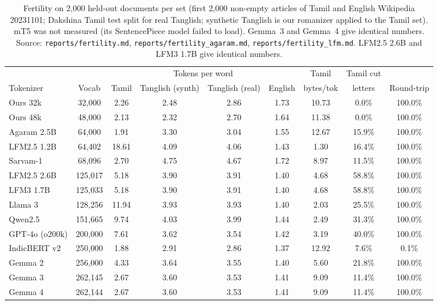 \documentclass[11pt]{article}
\begin{document}
\begin{table}[t]
\centering
\small
\begin{tabular}{lcccccccc}
\toprule
 & & \multicolumn{4}{c}{Tokens per word} & Tamil & Tamil cut & \\
\cmidrule(lr){3-6}
Tokenizer & Vocab & Tamil & Tanglish (synth) & Tanglish (real) & English & bytes/tok & letters & Round-trip \\
\midrule
Ours 32k & 32,000 & 2.26 & 2.48 & 2.86 & 1.73 & 10.73 & 0.0\% & 100.0\% \\
Ours 48k & 48,000 & 2.13 & 2.32 & 2.70 & 1.64 & 11.38 & 0.0\% & 100.0\% \\
Agaram 2.5B & 64,000 & 1.91 & 3.30 & 3.04 & 1.55 & 12.67 & 15.9\% & 100.0\% \\
LFM2.5 1.2B & 64,402 & 18.61 & 4.09 & 4.06 & 1.43 & 1.30 & 16.4\% & 100.0\% \\
Sarvam-1 & 68,096 & 2.70 & 4.75 & 4.67 & 1.72 & 8.97 & 11.5\% & 100.0\% \\
LFM2.5 2.6B & 125,017 & 5.18 & 3.90 & 3.91 & 1.40 & 4.68 & 58.8\% & 100.0\% \\
LFM3 1.7B & 125,033 & 5.18 & 3.90 & 3.91 & 1.40 & 4.68 & 58.8\% & 100.0\% \\
Llama 3 & 128,256 & 11.94 & 3.93 & 3.93 & 1.40 & 2.03 & 25.5\% & 100.0\% \\
Qwen2.5 & 151,665 & 9.74 & 4.03 & 3.99 & 1.44 & 2.49 & 31.3\% & 100.0\% \\
GPT-4o (o200k) & 200,000 & 7.61 & 3.62 & 3.54 & 1.42 & 3.19 & 40.0\% & 100.0\% \\
IndicBERT v2 & 250,000 & 1.88 & 2.91 & 2.86 & 1.37 & 12.92 & 7.6\% & 0.1\% \\
Gemma 2 & 256,000 & 4.33 & 3.64 & 3.55 & 1.40 & 5.60 & 21.8\% & 100.0\% \\
Gemma 3 & 262,145 & 2.67 & 3.60 & 3.53 & 1.41 & 9.09 & 11.4\% & 100.0\% \\
Gemma 4 & 262,144 & 2.67 & 3.60 & 3.53 & 1.41 & 9.09 & 11.4\% & 100.0\% \\
\bottomrule
\end{tabular}
\caption{Fertility on 2,000 held-out documents per set (first 2,000 non-empty articles of Tamil and English Wikipedia 20231101; Dakshina Tamil test split for real Tanglish; synthetic Tanglish is our romanizer applied to the Tamil set). mT5 was not measured (its SentencePiece model failed to load). Gemma~3 and Gemma~4 give identical numbers. Source: \texttt{reports/fertility.md}, \texttt{reports/fertility\_agaram.md}, \texttt{reports/fertility\_lfm.md}. LFM2.5 2.6B and LFM3 1.7B give identical numbers.}
\label{tab:fertility}
\end{table}
\end{document}
